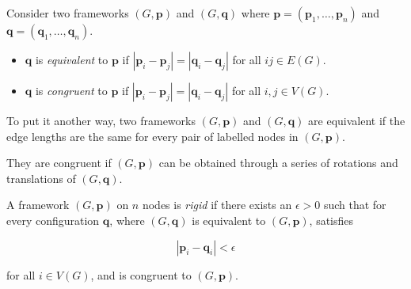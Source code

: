 \begin{definition}
Consider two frameworks $(G,\mathbf{p})$ and $(G,\mathbf{q})$ where $\mathbf{p} = (\mathbf{p}_1, \hdots, \mathbf{p}_n)$ and $\mathbf{q} = (\mathbf{q}_1, \hdots, \mathbf{q}_n)$.
\begin{itemize}
    \item $\mathbf{q}$ is \textit{equivalent} to $\mathbf{p}$ if $|\mathbf{p}_i - \mathbf{p}_j| = |\mathbf{q}_i - \mathbf{q}_j|$ for all $ij \in E(G)$.
    \vspace{-3mm}
    \item $\mathbf{q}$ is \textit{congruent} to $\mathbf{p}$ if $|\mathbf{p}_i - \mathbf{p}_j| = |\mathbf{q}_i - \mathbf{q}_j|$ for all $i, j \in V(G)$.
\end{itemize}
\end{definition}

\begin{flushleft}
To put it another way, two frameworks $(G,\mathbf{p})$ and $(G,\mathbf{q})$ are equivalent if the edge lengths are the same for every pair of labelled nodes in $(G,\mathbf{p})$.

They are congruent if $(G,\mathbf{p})$ can be obtained through a series of rotations and translations of $(G,\mathbf{q})$. 
\end{flushleft}

\begin{definition}
A framework $(G,\mathbf{p})$ on $n$ nodes is \textit{rigid} if there exists an $\epsilon>0$ such that for every configuration $\mathbf{q}$, where $(G,\mathbf{q})$ is equivalent to $(G,\mathbf{p})$, satisfies 

\[
|\mathbf{p}_i - \mathbf{q}_i| < \epsilon
\]
\begin{flushleft}
for all $i \in V(G)$, and is congruent to $(G,\mathbf{p})$.  
\end{flushleft}
\end{definition}

